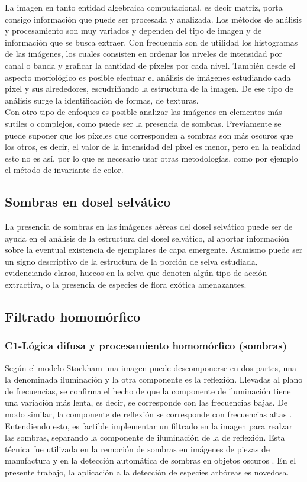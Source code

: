 La imagen en tanto entidad algebraica computacional, es decir matriz, porta consigo información que puede ser procesada y analizada. Los métodos de análisis y procesamiento son muy variados y dependen del tipo de imagen y de información que se busca extraer. Con frecuencia son de utilidad los histogramas de las imágenes, los cuales consisten en ordenar los niveles de intensidad por canal o banda y graficar la cantidad de píxeles por cada nivel. También desde el aspecto morfológico es posible efectuar el análisis de imágenes estudiando cada pixel y sus alrededores, escudriñando la estructura de la imagen. De ese tipo de análisis surge la identificación de formas, de texturas.\\
Con otro tipo de enfoques es posible analizar las imágenes en elementos más sutiles o complejos, como puede ser la presencia de sombras. Previamente se puede suponer que los píxeles que corresponden a sombras son más oscuros que los otros, es decir, el valor de la intensidad del pixel es menor, pero en la realidad esto no es así, por lo que es necesario usar otras metodologías, como por ejemplo el método de invariante de color.
\subsection{Sombras en dosel selvático}
La presencia de sombras en las imágenes aéreas del dosel selvático puede ser de ayuda en el análisis de la estructura del dosel selvático, al aportar información sobre la eventual existencia de ejemplares de capa emergente. Asimismo puede ser un signo descriptivo de la estructura de la porción de selva estudiada, evidenciando claros, huecos en la selva que denoten algún tipo de acción extractiva, o la presencia de especies de flora exótica amenazantes.
\subsection{Filtrado homomórfico }
\subsubsection{C1-Lógica difusa y procesamiento homomórfico (sombras)}
Según el modelo Stockham \cite{stockham_image_1972} una imagen puede descomponerse en dos partes, una la denominada iluminación y la otra componente es la reflexión. Llevadas al plano de frecuencias, se confirma el hecho de que la componente de iluminación tiene una variación más lenta, es decir, se corresponde con las frecuencias bajas. De modo similar, la componente de reflexión se corresponde con frecuencias altas \cite{oppenheim_nonlinear_1968}. Entendiendo esto, es factible implementar un filtrado en la imagen para realzar las sombras, separando la componente de iluminación de la de reflexión. Esta técnica fue utilizada en la remoción de sombras en imágenes de piezas de manufactura \cite{yang_research_2012} y en la detección automática de sombras en objetos oscuros \cite{etemadnia_automatic_2003}. En el presente trabajo, la aplicación a la detección de especies arbóreas es novedosa. 
